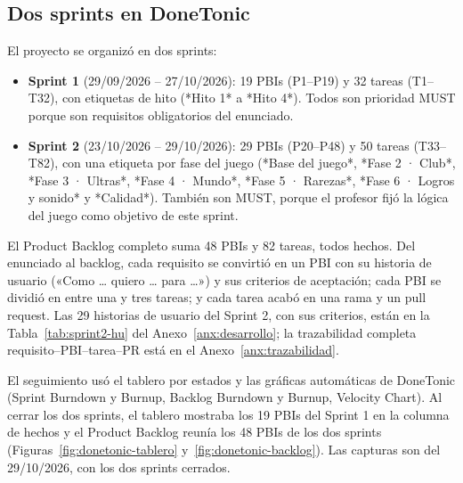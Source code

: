 \subsection{Dos sprints en DoneTonic}

El proyecto se organizó en dos sprints:

\begin{itemize}
    \item \textbf{Sprint 1} (29/09/2026 -- 27/10/2026): 19 PBIs (P1--P19) y 32 tareas (T1--T32), con etiquetas de hito (*Hito 1* a *Hito 4*). Todos son prioridad MUST porque son requisitos obligatorios del enunciado.
    \item \textbf{Sprint 2} (23/10/2026 -- 29/10/2026): 29 PBIs (P20--P48) y 50 tareas (T33--T82), con una etiqueta por fase del juego (*Base del juego*, *Fase 2 · Club*, *Fase 3 · Ultras*, *Fase 4 · Mundo*, *Fase 5 · Rarezas*, *Fase 6 · Logros y sonido* y *Calidad*). También son MUST, porque el profesor fijó la lógica del juego como objetivo de este sprint.
\end{itemize}

El Product Backlog completo suma 48 PBIs y 82 tareas, todos hechos. Del enunciado al backlog, cada requisito se convirtió en un PBI con su historia de usuario («Como … quiero … para …») y sus criterios de aceptación; cada PBI se dividió en entre una y tres tareas; y cada tarea acabó en una rama y un pull request. Las 29 historias de usuario del Sprint 2, con sus criterios, están en la Tabla~\ref{tab:sprint2-hu} del Anexo~\ref{anx:desarrollo}; la trazabilidad completa requisito--PBI--tarea--PR está en el Anexo~\ref{anx:trazabilidad}.

El seguimiento usó el tablero por estados y las gráficas automáticas de DoneTonic (Sprint Burndown y Burnup, Backlog Burndown y Burnup, Velocity Chart). Al cerrar los dos sprints, el tablero mostraba los 19 PBIs del Sprint 1 en la columna de hechos y el Product Backlog reunía los 48 PBIs de los dos sprints (Figuras~\ref{fig:donetonic-tablero} y~\ref{fig:donetonic-backlog}). Las capturas son del 29/10/2026, con los dos sprints cerrados.


